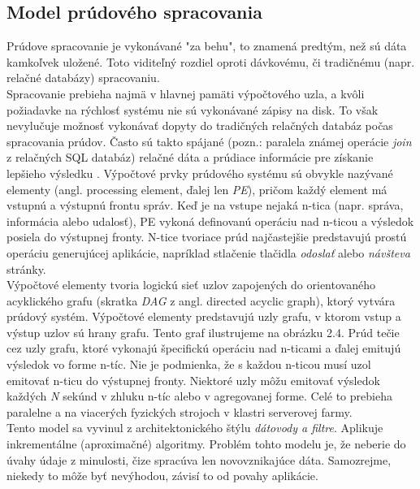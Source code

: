 \subsection{Model prúdového spracovania}
Prúdove spracovanie je vykonávané "za behu", to znamená predtým, než sú dáta kamkoľvek uložené. Toto viditeľný rozdiel oproti dávkovému, či tradičnému (napr. relačné databázy) spracovaniu. 
\\[5pt]
Spracovanie prebieha najmä v hlavnej pamäti výpočtového uzla, a kvôli požiadavke na rýchlosť systému nie sú vykonávané zápisy na disk. To však nevylučuje možnosť vykonávať dopyty do tradičných relačných databáz počas spracovania prúdov. Často sú takto spájané (pozn.: paralela známej operácie \textit{join} z relačných SQL databáz) relačné dáta a prúdiace informácie pre získanie lepšieho výsledku \citep{babcock2002models}. Výpočtové prvky prúdového systému sú obvykle nazývané elementy (angl. processing element, ďalej len \textit{PE}), pričom každý element má vstupnú a výstupnú frontu správ. Keď je na vstupe nejaká n-tica (napr. správa, informácia alebo udalosť), PE vykoná definovanú operáciu nad n-ticou a výsledok posiela do výstupnej fronty. N-tice tvoriace prúd najčastejšie predstavujú prostú operáciu generujúcej aplikácie, napríklad stlačenie tlačidla \textit{odoslať} alebo \textit{návšteva} stránky. 
\\[5pt]
Výpočtové elementy tvoria logickú sieť uzlov zapojených do orientovaného acyklického grafu (skratka \textit{DAG} z angl. directed acyclic graph), ktorý vytvára prúdový systém. Výpočtové elementy predstavujú uzly grafu, v ktorom vstup a výstup uzlov sú hrany grafu. Tento graf ilustrujeme na obrázku 2.4. Prúd tečie cez uzly grafu, ktoré vykonajú špecifickú operáciu nad n-ticami a ďalej emitujú výsledok vo forme n-tíc. Nie je podmienka, že s každou n-ticou musí uzol emitovať n-ticu do výstupnej fronty. Niektoré uzly môžu emitovať výsledok každých \textit{N} sekúnd v zhluku n-tíc alebo v agregovanej forme. Celé to prebieha paralelne a na viacerých fyzických strojoch v klastri serverovej farmy. 
\\[5pt]
Tento model sa vyvinul z architektonického štýlu \textit{dátovody a filtre}. Aplikuje inkrementálne (aproximačné) algoritmy. Problém tohto modelu je, že neberie do úvahy údaje z minulosti, čize spracúva len novovznikajúce dáta. Samozrejme, niekedy to môže byť nevýhodou, závisí to od povahy aplikácie.
\label{prudove-DAG}

